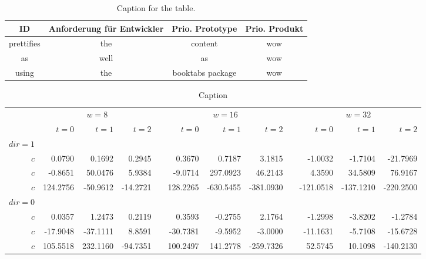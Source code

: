 \begin{table}[h!]
  \centering
  \begin{tabular}{cccc}
    \toprule
    \rowcolor[HTML]{656565}
    ID & Anforderung für Entwickler & Prio. Prototype & Prio. Produkt \\
    \midrule
    \rowcolor[HTML]{9b9b9b}
    prettifies & the & content & wow \\
    as & well & as & wow \\
    using & the & booktabs package & wow\\
    \bottomrule
  \end{tabular}
  \caption{Caption for the table.}
  \label{tab:table1}
\end{table}

\begin{table*}\centering
{}
\begin{tabular}{@{}rrrrcrrrcrrr@{}}\toprule
& \multicolumn{3}{c}{$w = 8$} & \phantom{abc}& \multicolumn{3}{c}{$w = 16$} &
\phantom{abc} & \multicolumn{3}{c}{$w = 32$}\\
\cmidrule{2-4} \cmidrule{6-8} \cmidrule{10-12}
& $t=0$ & $t=1$ & $t=2$ && $t=0$ & $t=1$ & $t=2$ && $t=0$ & $t=1$ & $t=2$\\ \midrule
$dir=1$\\
$c$ & 0.0790 & 0.1692 & 0.2945 && 0.3670 & 0.7187 & 3.1815 && -1.0032 & -1.7104 & -21.7969\\
$c$ & -0.8651& 50.0476& 5.9384&& -9.0714& 297.0923& 46.2143&& 4.3590& 34.5809& 76.9167\\
$c$ & 124.2756& -50.9612& -14.2721&& 128.2265& -630.5455& -381.0930&& -121.0518& -137.1210& -220.2500\\
$dir=0$\\
$c$ & 0.0357& 1.2473& 0.2119&& 0.3593& -0.2755& 2.1764&& -1.2998& -3.8202& -1.2784\\
$c$ & -17.9048& -37.1111& 8.8591&& -30.7381& -9.5952& -3.0000&& -11.1631& -5.7108& -15.6728\\
$c$ & 105.5518& 232.1160& -94.7351&& 100.2497& 141.2778& -259.7326&& 52.5745& 10.1098& -140.2130\\
\bottomrule
\end{tabular}
\caption{Caption}
\end{table*}
